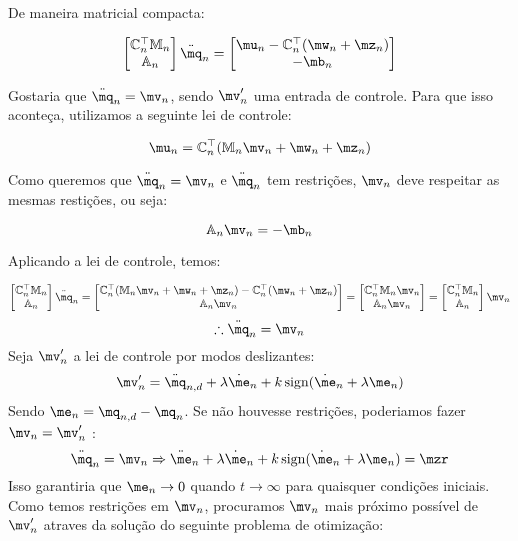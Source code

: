 De maneira matricial compacta:

$$
\begin{bmatrix}
\mC_n^\top \mM_n \\
\mA_n
\end{bmatrix}
\ddot{\mq}_n
=
\begin{bmatrix}
\mu_n - \mC_n^\top(\mw_n + \mz_n) \\
-\mb_n
\end{bmatrix}
$$

Gostaria que $ \ddot{\mq}_n = \mv_n $, sendo $\mv'_n$ uma entrada de controle. Para que isso aconte\c{c}a, utilizamos a seguinte lei de controle:

$$ \mu_n = \mC_n^\top ( \mM_n \mv_n + \mw_n + \mz_n ) $$

Como queremos que $ \ddot{\mq}_n = \mv_n $ e $\ddot{\mq}_n$ tem restri\c{c}\~oes, $\mv_n$ deve respeitar as mesmas resti\c{c}\~oes, ou seja:

$$ \mA_n \mv_n = -\mb_n $$

Aplicando a lei de controle, temos:

$$
\begin{bmatrix}
\mC_n^\top \mM_n \\
\mA_n
\end{bmatrix}
\ddot{\mq}_n
=
\begin{bmatrix}
\mC_n^\top ( \mM_n \mv_n + \mw_n + \mz_n ) - \mC_n^\top(\mw_n + \mz_n) \\
\mA_n \mv_n
\end{bmatrix}
=
\begin{bmatrix}
\mC_n^\top  \mM_n \mv_n \\
\mA_n \mv_n
\end{bmatrix}
=
\begin{bmatrix}
\mC_n^\top \mM_n \\
\mA_n
\end{bmatrix}
\mv_n
$$
$$
\therefore \ddot{\mq}_n = \mv_n
$$
Seja $\mv'_n$ a lei de controle por modos deslizantes:
$$ \mv'_n = \ddot{\mq}_{n, d} + \lambda \dot{\me}_n + k \sign (\dot{\me}_n + \lambda \me_n) $$
Sendo $ \me_n = \mq_{n,d} - \mq_n $. Se n\~ao houvesse restri\c{c}\~oes, poderiamos fazer $ \mv_n = \mv'_n $ :
$$ \ddot{\mq}_n = \mv_n \Rightarrow  \ddot{\me}_n + \lambda \dot{\me}_n + k \sign (\dot{\me}_n + \lambda \me_n) = \mzr$$
Isso garantiria que $\me_n \rightarrow 0$ quando $t \rightarrow \infty$ para quaisquer condi\c{c}\~oes iniciais. \\

Como temos restri\c{c}\~oes em $\mv_n$, procuramos $\mv_n$ mais pr\'oximo poss\'ivel de $\mv'_n$ atraves da solu\c{c}\~ao do seguinte problema de otimiza\c{c}\~ao:

